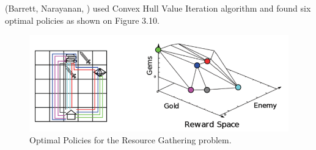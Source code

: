 (Barrett, Narayanan, \cite{BarrettN2008}) used Convex Hull Value Iteration algorithm and found six optimal policies as shown on Figure 3.10.
\begin{figure}[ht]
\vskip 0.2in
\centering
\includegraphics[scale=0.8]{rgpareto.png}
\caption{Optimal Policies for the Resource Gathering problem.}
\label{ParetoDominance}
\end{figure} 